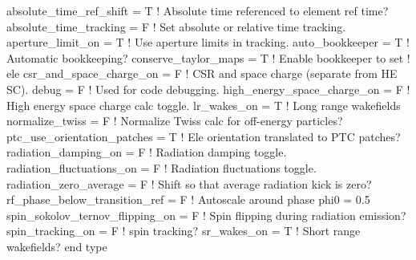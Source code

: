 {\begin{example}
    absolute_time_ref_shift = T         ! Absolute time referenced to element ref time?
    absolute_time_tracking = F          ! Set absolute or relative time tracking.
    aperture_limit_on = T               ! Use aperture limits in tracking.
    auto_bookkeeper = T                 ! Automatic bookkeeping?
    conserve_taylor_maps = T            ! Enable bookkeeper to set
                                        ! ele%
    csr_and_space_charge_on = F         ! CSR and space charge (separate from HE SC).
    debug = F                           ! Used for code debugging.
    high_energy_space_charge_on = F     ! High energy space charge calc toggle.
    lr_wakes_on = T                     ! Long range wakefields
    normalize_twiss = F                 ! Normalize Twiss calc for off-energy particles?
    ptc_use_orientation_patches = T     ! Ele orientation translated to PTC patches?
    radiation_damping_on = F            ! Radiation damping toggle.
    radiation_fluctuations_on = F       ! Radiation fluctuations toggle.
    radiation_zero_average = F          ! Shift so that average radiation kick is zero?
    rf_phase_below_transition_ref = F   ! Autoscale around phase phi0 = 0.5
    spin_sokolov_ternov_flipping_on = F ! Spin flipping during radiation emission?
    spin_tracking_on = F                ! spin tracking?
    sr_wakes_on = T                     ! Short range wakefields?
  end type
\end{example}

}
